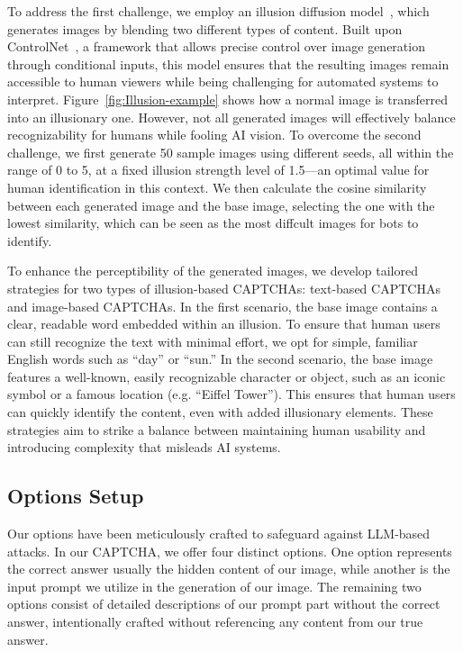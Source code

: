 To address the first challenge, we employ an illusion diffusion model~\cite{AP123}, which generates images by blending two different types of content. Built upon ControlNet~\cite{zhang2023adding}, a framework that allows precise control over image generation through conditional inputs, this model ensures that the resulting images remain accessible to human viewers while being challenging for automated systems to interpret.
Figure~\ref{fig:Illusion-example} shows how a normal image is transferred into an illusionary one.
However, not all generated images will effectively balance recognizability for humans while fooling AI vision. To overcome the second challenge, we first generate 50 sample images using different seeds, all within the range of 0 to 5, at a fixed illusion strength level of 1.5—an optimal value for human identification in this context. We then calculate the cosine similarity between each generated image and the base image, selecting the one with the lowest similarity, which can be seen as the most diffcult images for bots to identify.

To enhance the perceptibility of the generated images, we develop tailored strategies for two types of illusion-based CAPTCHAs: text-based CAPTCHAs and image-based CAPTCHAs. In the first scenario, the base image contains a clear, readable word embedded within an illusion. To ensure that human users can still recognize the text with minimal effort, we opt for simple, familiar English words such as ``day'' or ``sun.'' 
In the second scenario, the base image features a well-known, easily recognizable character or object, such as an iconic symbol or a famous location (e.g. ``Eiffel Tower''). This ensures that human users can quickly identify the content, even with added illusionary elements. 
These strategies aim to strike a balance between maintaining human usability and introducing complexity that misleads AI systems. 


\subsection{Options Setup} 

Our options have been meticulously crafted to safeguard against LLM-based attacks. In our CAPTCHA, we offer four distinct options. One option represents the correct answer usually the hidden content of our image, while another is the input prompt we utilize in the generation of our image. The remaining two options consist of detailed descriptions of our prompt part without the correct answer, intentionally crafted without referencing any content from our true answer.

